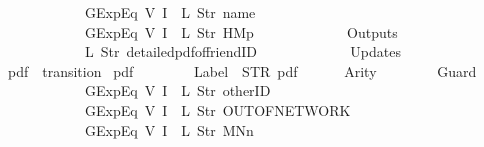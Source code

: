 \begin{isabellebody}
\ \ \ \ \ \ \ \ \ \ \ \ GExp{\isachardot}Eq\ {\isacharparenleft}V\ {\isacharparenleft}I\ {}{\isacharparenright}{\isacharparenright}\ {\isacharparenleft}L\ {\isacharparenleft}Str\ {\isacharprime}{\isacharprime}name{\isacharprime}{\isacharprime}{\isacharparenright}{\isacharparenright}{\isacharcomma}\isanewline
\ \ \ \ \ \ \ \ \ \ \ \ GExp{\isachardot}Eq\ {\isacharparenleft}V\ {\isacharparenleft}I\ {}{\isacharparenright}{\isacharparenright}\ {\isacharparenleft}L\ {\isacharparenleft}Str\ {\isacharprime}{\isacharprime}HM{}p{\isacharprime}{\isacharprime}{\isacharparenright}{\isacharparenright}\isanewline
\ \ \ \ \ \ {\isacharbrackright}{\isacharcomma}\isanewline
\ \ \ \ \ \ Outputs\ {\isacharequal}\ {\isacharbrackleft}\isanewline
\ \ \ \ \ \ \ \ \ \ \ \ {\isacharparenleft}L\ {\isacharparenleft}Str\ {\isacharprime}{\isacharprime}detailed{\isacharunderscore}pdf{\isacharunderscore}of{\isacharunderscore}friendID{\isacharprime}{\isacharprime}{\isacharparenright}{\isacharparenright}\isanewline
\ \ \ \ \ \ {\isacharbrackright}{\isacharcomma}\isanewline
\ \ \ \ \ \ Updates\ {\isacharequal}\ {\isacharbrackleft}{\isacharbrackright}\isanewline
{\isasymrparr}{\isachardoublequoteclose}\isanewline
\isanewline
{}\isamarkupfalse%
\ {\isachardoublequoteopen}pdf{}{\isachardoublequoteclose}\ {\isacharcolon}{\isacharcolon}\ {\isachardoublequoteopen}transition{\isachardoublequoteclose}\ \isanewline
{\isachardoublequoteopen}pdf{}\ {\isasymequiv}\ {\isasymlparr}\isanewline
\ \ \ \ \ \ Label\ {\isacharequal}\ STR\ {\isacharprime}{\isacharprime}pdf{\isacharprime}{\isacharprime}{\isacharcomma}\isanewline
\ \ \ \ \ \ Arity\ {\isacharequal}\ {}{\isacharcomma}\isanewline
\ \ \ \ \ \ Guard\ {\isacharequal}\ {\isacharbrackleft}\isanewline
\ \ \ \ \ \ \ \ \ \ \ \ GExp{\isachardot}Eq\ {\isacharparenleft}V\ {\isacharparenleft}I\ {}{\isacharparenright}{\isacharparenright}\ {\isacharparenleft}L\ {\isacharparenleft}Str\ {\isacharprime}{\isacharprime}otherID{\isacharprime}{\isacharprime}{\isacharparenright}{\isacharparenright}{\isacharcomma}\isanewline
\ \ \ \ \ \ \ \ \ \ \ \ GExp{\isachardot}Eq\ {\isacharparenleft}V\ {\isacharparenleft}I\ {}{\isacharparenright}{\isacharparenright}\ {\isacharparenleft}L\ {\isacharparenleft}Str\ {\isacharprime}{\isacharprime}OUT{\isacharunderscore}OF{\isacharunderscore}NETWORK{\isacharprime}{\isacharprime}{\isacharparenright}{\isacharparenright}{\isacharcomma}\isanewline
\ \ \ \ \ \ \ \ \ \ \ \ GExp{\isachardot}Eq\ {\isacharparenleft}V\ {\isacharparenleft}I\ {}{\isacharparenright}{\isacharparenright}\ {\isacharparenleft}L\ {\isacharparenleft}Str\ {\isacharprime}{\isacharprime}MNn{}{\isacharprime}{\isacharprime}{\isacharparenright}{\isacharparenright}\isanewline

\end{isabellebody}

